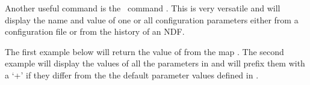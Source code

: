 \begin{description}
\begin{terminalv}
\end{terminalv}

Another useful command is the \Kappa\ command \configecho.
This is very versatile and will display the name and value of one or
all configuration parameters either from a configuration file or from
the history of an NDF.

The first example below will return the value of  from
the map . The second example will display the values of all
the parameters in  and will prefix them with a `+' if they
differ from the the default parameter values defined in .

\begin{terminalv}
\end{terminalv}
\end{description}


